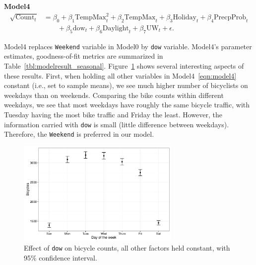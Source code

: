 \documentclass [11pt, proquest] {uwthesis}[2015/03/03]
\begin{document}
\textbf{Model4}
\begin{align}
\sqrt{\text{Count}_t} &= \beta_0 + \beta_1 \text{TempMax}^2_t + \beta_2 \text{TempMax}_t + \beta_3 \text{Holiday}_t + \beta_4 \text{PrecpProb}_t \nonumber\\
&\qquad + \beta_5 \text{dow}_t  + \beta_6 \text{Daylight}_t + \beta_7 \text{UW}_t + \epsilon.\label{eqn:model4}
\end{align}


Model4 replaces \texttt{Weekend} variable in Model0 by \texttt{dow} variable. Model4's parameter estimates, goodness-of-fit metrics are summarized in Table~\ref{tbl:modelresult_seasonal}. Figure~\ref{fig:dow} shows several interesting aspects of these results. First, when holding all other variables in Model4~\eqref{eqn:model4} constant (i.e., set to sample means), we see much higher number of bicyclists on weekdays than on weekends. Comparing the bike counts within different weekdays, we see that most weekdays have roughly the same bicycle traffic, with Tuesday having the most bike traffic and Friday the least. However, the information carried with \texttt{dow} is small (little difference between weekdays). Therefore, the \texttt{Weekend} is preferred in our model. %

\begin{figure}
\centering
   \includegraphics[width=0.7\textwidth]{figures/sim/dow} 
  \caption{Effect of \texttt{dow} on bicycle counts, all other factors held constant, with 95\% confidence interval.}
  \label{fig:dow}
\end{figure}
\end{document}
